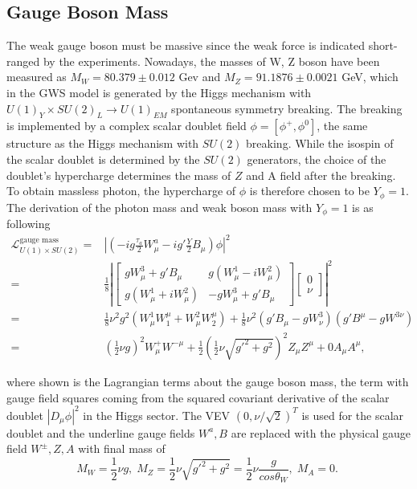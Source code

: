 \subsection{Gauge Boson Mass}
The weak gauge boson must be massive since the weak force is indicated short-ranged by the experiments. Nowadays, the masses of W, Z boson have been measured as $M_W =80.379\pm 0.012 $ Gev and $M_Z=91.1876\pm0.0021$ GeV, which in the GWS model is generated by the Higgs mechanism with $U(1)_Y \times SU(2)_L \to U(1)_{EM}$ spontaneous symmetry breaking. The breaking is implemented by a complex scalar doublet field $\phi = [\phi^+, \phi^0]$, the same structure as the Higgs mechanism with $SU(2)$ breaking. While the isospin of the scalar doublet is determined by the $SU(2)$ generators, the choice of the doublet's hypercharge determines the mass of $Z$ and A field after the breaking. To obtain massless photon, the hypercharge of $\phi$ is therefore chosen to be $Y_{\phi} = 1$. The derivation of the photon mass and weak boson mass with $Y_{\phi} = 1$ is as following 
\begin{equation}
\begin{split}
    \mathcal{L}_{U(1)\times SU(2)}^{\text{gauge mass}} 
    =& \left\lvert  (-ig\frac{\tau_a}{2} W_\mu^a - ig'\frac{Y}{2}B_\mu ) \phi \right\rvert^2 \\ 
    = & \frac{1}{8} \left\lvert 
        \begin{bmatrix} 
             gW_\mu^3 + g'B_\mu & g(W^1_\mu-iW^2_\mu) \\
            g(W^1_\mu+iW^2_\mu) & -gW_\mu^3 + g'B_\mu 
        \end{bmatrix}
        \begin{bmatrix} 0 \\ \nu \end{bmatrix} \right\rvert^2 \\
    = & \frac{1}{8}\nu^2g^2 (W^1_\mu W^\mu_1 +W^2_\mu W^\mu_2) + \frac{1}{8}\nu^2(g'B_\mu-gW^3_\nu)(g'B^\mu-gW^{3\nu}) \\
    = &  (\frac{1}{2}\nu g)^2 W^+_\mu W^{-\mu} +  \frac{1}{2} (\frac{1}{2}\nu \sqrt{g'^2+g^2})^2 Z_\mu Z^\mu + 0 A_\mu A^\mu ,
\end{split}
\label{eqn:relatedWorks:qft:gws:gaugeMassLagragian}
\end{equation}

\noindent where shown is the Lagrangian terms about the gauge boson mass, the term with gauge field squares coming from the squared covariant derivative of the scalar doublet $|D_\mu \phi|^2$ in the Higgs sector. The VEV $ (0, \nu/\sqrt{2})^T$ is used for the scalar doublet and the underline gauge fields $W^a, B$  are replaced with the physical gauge field $W^\pm, Z, A$ with final mass of
\begin{equation}
    M_W = \frac{1}{2}\nu g, \; M_Z = \frac{1}{2}\nu \sqrt{g'^2+g^2}= \frac{1}{2}\nu \frac{g}{cos\theta_W}, \;  M_A= 0 . \; 
\end{equation}

